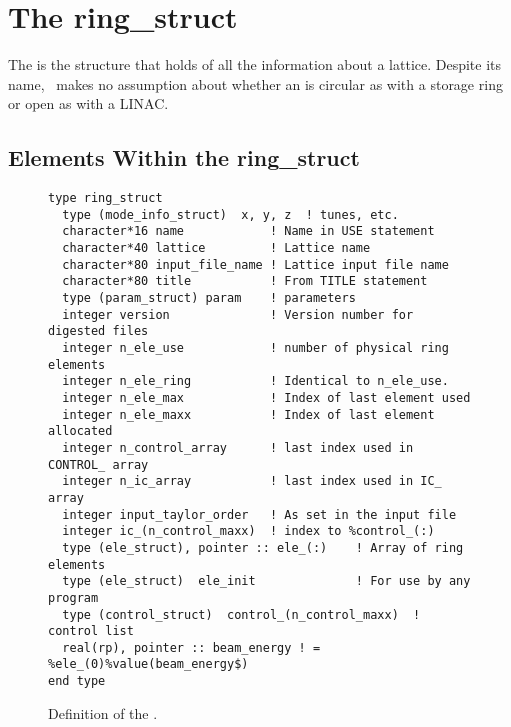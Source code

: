 \chapter{The ring\_struct}
\label{c:ring_struct}

The  is the structure that holds of all the information 
about a lattice.   Despite its name, \bmad\
makes no assumption about whether an  is circular as
with a storage ring or open as with a LINAC.

\section{Elements Within the ring\_struct}

\begin{figure}[htb]
\centering
\begin{verbatim}
type ring_struct
  type (mode_info_struct)  x, y, z  ! tunes, etc.
  character*16 name            ! Name in USE statement
  character*40 lattice         ! Lattice name
  character*80 input_file_name ! Lattice input file name
  character*80 title           ! From TITLE statement
  type (param_struct) param    ! parameters
  integer version              ! Version number for digested files
  integer n_ele_use            ! number of physical ring elements
  integer n_ele_ring           ! Identical to n_ele_use.
  integer n_ele_max            ! Index of last element used
  integer n_ele_maxx           ! Index of last element allocated
  integer n_control_array      ! last index used in CONTROL_ array
  integer n_ic_array           ! last index used in IC_ array
  integer input_taylor_order   ! As set in the input file
  integer ic_(n_control_maxx)  ! index to %control_(:)
  type (ele_struct), pointer :: ele_(:)    ! Array of ring elements
  type (ele_struct)  ele_init              ! For use by any program
  type (control_struct)  control_(n_control_maxx)  ! control list
  real(rp), pointer :: beam_energy ! = %ele_(0)%value(beam_energy$)
end type
\end{verbatim}
\caption{Definition of the .}
\label{f:ring_struct}
\end{figure}

